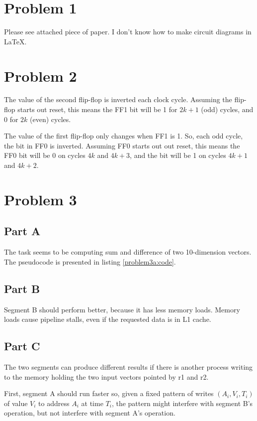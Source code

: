 \section{Problem 1}
Please see attached piece of paper. I don't know how to make circuit diagrams
in \LaTeX.

\section{Problem 2}
The value of the second flip-flop is inverted each clock cycle. Assuming the
flip-flop starts out reset, this means the FF1 bit will be 1 for $2k + 1$ (odd)
cycles, and 0 for $2k$ (even) cycles.

The value of the first flip-flop only changes when FF1 is 1. So, each odd
cycle, the bit in FF0 is inverted. Assuming FF0 starts out out reset, this
means the FF0 bit will be 0 on cycles $4k$ and $4k + 3$, and the bit will be 1
on cycles $4k + 1$ and $4k + 2$.

\section{Problem 3}

\subsection{Part A}
The task seems to be computing sum and difference of two 10-dimension vectors.
The pseudocode is presented in listing \ref{problem3a:code}.



\subsection{Part B}
Segment B should perform better, because it has less memory loads. Memory loads
cause pipeline stalls, even if the requested data is in L1 cache.

\subsection{Part C}
The two segments can produce different results if there is another process
writing to the memory holding the two input vectors pointed by r1 and r2.

First, segment A should run faster so, given a fixed pattern of writes $(A_i,
V_i, T_i)$ of value $V_i$ to address $A_i$ at time $T_i$, the pattern might
interfere with segment B's operation, but not interfere with segment A's
operation.

